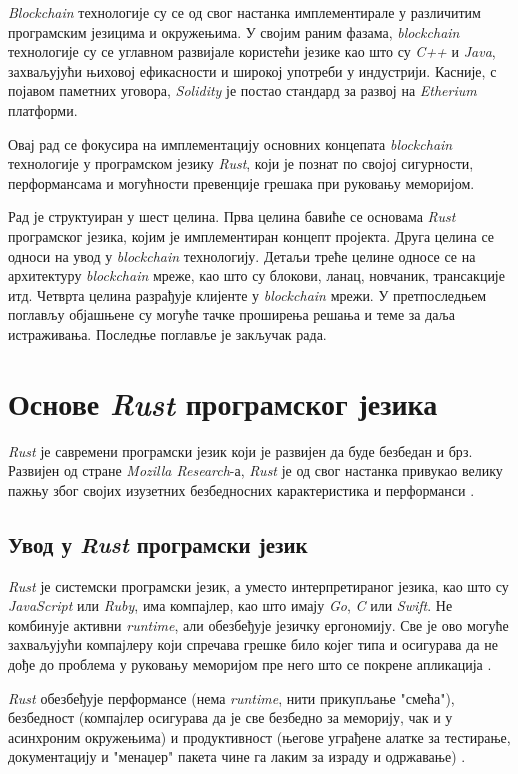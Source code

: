 \documentclass[12pt, a4paper]{article}
\begin{document}
\textit{Blockchain} технологије су се од свог настанка имплементирале у различитим програмским језицима и окружењима. У својим раним фазама, \textit{blockchain} технологије су се углавном развијале користећи језике као што су \textit{C++} и \textit{Java}, захваљујући њиховој ефикасности и широкој употреби у индустрији. Касније, с појавом паметних уговора, \textit{Solidity} је постао стандард за развој на \textit{Etherium} платформи.

Овај рад се фокусира на имплементацију основних концепата \textit{blockchain} технологије у програмском језику \textit{Rust}, који је познат по својој сигурности, перформансама и могућности превенције грешака при руковању меморијом.

Рад је структуиран у шест целина. Прва целина бавиће се основама \textit{Rust} програмског језика, којим је имплементиран концепт пројекта. Друга целина се односи на увод у \textit{blockchain} технологију. Детаљи треће целине односе се на архитектуру \textit{blockchain} мреже, као што су блокови, ланац, новчаник, трансакције итд. Четврта целина разрађује клијенте у \textit{blockchain} мрежи. У претпоследњем поглављу објашњене су могуће тачке проширења решања и теме за даља истраживања. Последње поглавље је закључак рада.
\pagebreak

\section{Основе \textit{Rust} програмског језика}
\textit{Rust} је савремени програмски језик који је развијен да буде безбедан и брз. Развијен од стране \textit{Mozilla Research}-а, \textit{Rust} је од свог настанка привукао велику пажњу због својих изузетних безбедносних карактеристика и перформанси \cite{5}.

\subsection{Увод у \textit{Rust} програмски језик}
\textit{Rust} је системски програмски језик, а уместо интерпретираног језика, као што су \textit{JavaScript} или \textit{Ruby}, има компајлер, као што имају \textit{Go}, \textit{C} или \textit{Swift}. Не комбинује активни \textit{runtime}, али обезбеђује језичку ергономију. Све је ово могуће захваљујући компајлеру који спречава грешке било којег типа и осигурава да не дође до проблема у руковању меморијом пре него што се покрене апликација \cite{6}.

\textit{Rust} обезбеђује перформансе (нема \textit{runtime}, нити прикупљање "смећа"), безбедност (компајлер осигурава да је све безбедно за меморију, чак и у асинхроним окружењима) и продуктивност (његове уграђене алатке за тестирање, документацију и "менаџер" пакета чине га лаким за израду и одржавање) \cite{6}. 
\end{document}
